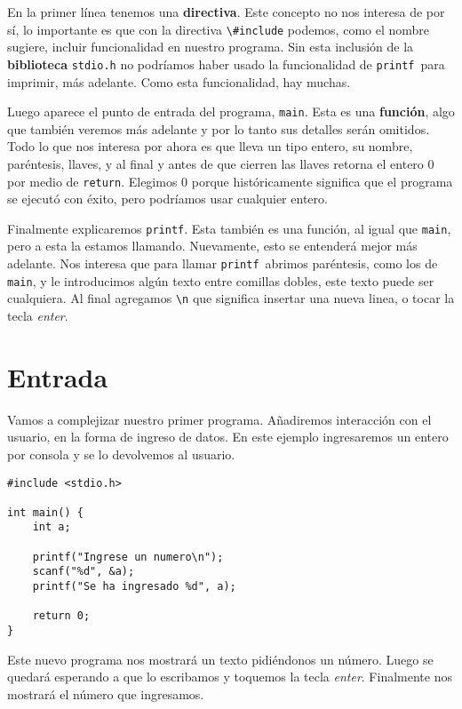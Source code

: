 \documentclass[10pt]{article}
\newcommand{\cprintf}[0]{\lstinline{printf}}
\newcommand{\cmain}[0]{\lstinline{main}}
\begin{document}
\bigskip

En la primer línea tenemos una \textbf{directiva}. Este concepto no nos interesa de por sí, lo importante es que con la directiva \lstinline{\#include} podemos, como el nombre sugiere, incluir funcionalidad en nuestro programa. Sin esta inclusión de la \textbf{biblioteca} \lstinline{stdio.h} no podríamos haber usado la funcionalidad de \cprintf\ para imprimir, más adelante. Como esta funcionalidad, hay muchas.

\bigskip

Luego aparece el punto de entrada del programa, \cmain. Esta es una \textbf{función}, algo que también veremos más adelante y por lo tanto sus detalles serán omitidos. Todo lo que nos interesa por ahora es que lleva un tipo entero, su nombre, paréntesis, llaves, y al final y antes de que cierren las llaves retorna el entero 0 por medio de \lstinline{return}. Elegimos 0 porque históricamente significa que el programa se ejecutó con éxito, pero podríamos usar cualquier entero.

\bigskip

Finalmente explicaremos \cprintf. Esta también es una función, al igual que \cmain, pero a esta la estamos llamando. Nuevamente, esto se entenderá mejor más adelante. Nos interesa que para llamar \cprintf\ abrimos paréntesis, como los de \cmain, y le introducimos algún texto entre comillas dobles, este texto puede ser cualquiera. Al final agregamos \lstinline{\n} que significa insertar una nueva linea, o tocar la tecla \textit{enter}.

\section{Entrada}

Vamos a complejizar nuestro primer programa. Añadiremos interacción con el usuario, en la forma de ingreso de datos. En este ejemplo ingresaremos un entero por consola y se lo devolvemos al usuario.

\begin{lstlisting}
#include <stdio.h>

int main() {
	int a;

	printf("Ingrese un numero\n");
	scanf("%d", &a);
	printf("Se ha ingresado %d", a);

	return 0;
}
\end{lstlisting}

Este nuevo programa nos mostrará un texto pidiéndonos un número. Luego se quedará esperando a que lo escribamos y toquemos la tecla \textit{enter}. Finalmente nos mostrará el número que ingresamos. 
\end{document}
